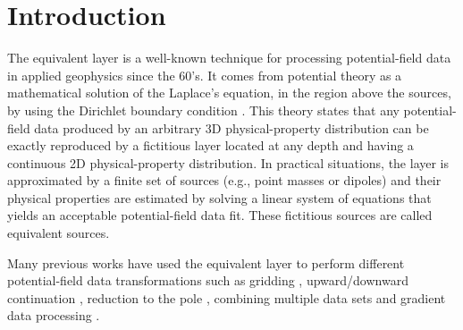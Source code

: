 \section{Introduction}

The equivalent layer is a well-known technique for processing potential-field data in applied geophysics 
since the 60's. 
It comes from potential theory as a mathematical solution of the Laplace's equation, in the region above the
sources, by using the Dirichlet boundary condition \citep{kellogg1929}.
This theory states that any potential-field data produced by an arbitrary 3D physical-property distribution can 
be exactly reproduced by a fictitious layer located at any depth and having a continuous 2D physical-property  
distribution. In practical situations, the layer is approximated by a finite set of sources (e.g., point masses 
or dipoles) and their physical properties are estimated by solving a linear system of equations that yields an 
acceptable potential-field data fit. These fictitious sources are called equivalent sources.

Many previous works have used the equivalent layer to perform different potential-field data 
transformations such as gridding \citep[e.g.,][]{dampney1969, cordell1992, mendonca-silva1994},
upward/downward continuation \citep[e.g.,][]{emilia1973, hansen-miyazaki1984, 
li-oldenburg2010}, reduction to the pole \citep[e.g.,][]{silva1986, leao-silva1989, guspi-novara2009, 
oliveirajr-etal2013}, combining multiple data sets \citep[e.g.,][]{boggs-dransfield2004} and 
gradient data processing \citep[e.g.,][]{barnes-lumley2011}.

